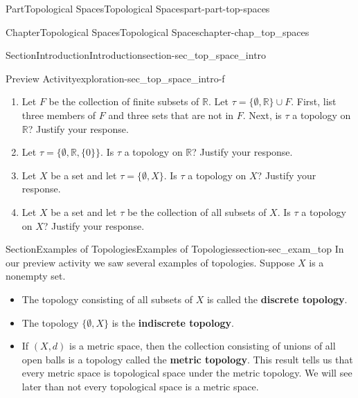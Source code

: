 \documentclass[oneside,10pt,]{book}
\newcommand{\terminology}[1]{\textbf{#1}}
\numberwithin{equation}{chapter}
\newcommand{\R}{\mathbb{R}}
\begin{document}
\begin{partptx}{Part}{Topological Spaces}{}{Topological Spaces}{}{}{part-part-top-spaces}
\begin{chapterptx}{Chapter}{Topological Spaces}{}{Topological Spaces}{}{}{chapter-chap_top_spaces}
\begin{sectionptx}{Section}{Introduction}{}{Introduction}{}{}{section-sec_top_space_intro}
\begin{exploration}{Preview Activity}{}{exploration-sec_top_space_intro-f}
\begin{enumerate}[font=\bfseries,label=(\alph*),ref=\alph*]
\begin{equation*}
\tau = \{\emptyset, \{a\}, \{b\}, \{c\}, \{d\}, \{a,b\}, \{a,c\}, \{a,d\}, \{b, d\}, \{c,d\}, X \}
\end{equation*}
a topology on \(X\)? Justify your response. If not, what is the smallest collection of subsets of \(X\) that need to be added to \(\tau\) to make \(\tau\) a topology on \(X\)?%
\item{}Let \(F\) be the collection of finite subsets of \(\R\). Let \(\tau = \{\emptyset, \R\} \cup F\). First, list three members of \(F\) and three sets that are not in \(F\). Next, is \(\tau\) a topology on \(\R\)? Justify your response.%
\item{}Let \(\tau = \{\emptyset, \R, \{0\} \}\). Is \(\tau\) a topology on \(\R\)? Justify your response.%
\item{}Let \(X\) be a set and let \(\tau = \{\emptyset, X\}\). Is \(\tau\) a topology on \(X\)? Justify your response.%
\item{}Let \(X\) be a set and let \(\tau\) be the collection of all subsets of \(X\). Is \(\tau\) a topology on \(X\)? Justify your response.%
\end{enumerate}%
\end{exploration}%
\end{sectionptx}
%
%
\typeout{************************************************}
\typeout{************************************************}
%
\begin{sectionptx}{Section}{Examples of Topologies}{}{Examples of Topologies}{}{}{section-sec_exam_top}
In our preview activity we saw several examples of topologies. Suppose \(X\) is a nonempty set.%
\begin{itemize}[label=\textbullet]
\item{}The topology consisting of all subsets of \(X\) is called the \terminology{discrete topology}.%
\item{}The topology \(\{\emptyset, X\}\) is the \terminology{indiscrete topology}.%
\item{}If \((X,d)\) is a metric space, then the collection consisting of unions of all open balls is a topology called the \terminology{metric topology}. This result tells us that every metric space is topological space under the metric topology. We will see later than not every topological space is a metric space.%
\end{itemize}
%
\par

\end{sectionptx}
\end{chapterptx}
\end{partptx}
\end{document}
